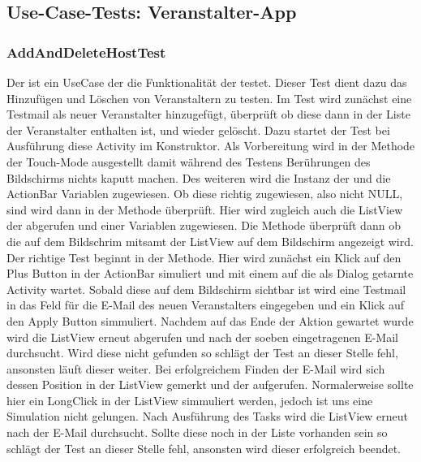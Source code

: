 \subsection{Use-Case-Tests: Veranstalter-App}
\subsubsection{AddAndDeleteHostTest}
Der  ist ein UseCase der die Funktionalität der  testet. Dieser Test dient dazu das Hinzufügen und Löschen von Veranstaltern zu testen. Im Test wird zunächst eine Testmail als neuer Veranstalter hinzugefügt, überprüft ob diese dann in der Liste der Veranstalter enthalten ist, und wieder gelöscht. Dazu startet der Test bei Ausführung diese Activity im Konstruktor. Als Vorbereitung wird in der  Methode der Touch-Mode ausgestellt damit während des Testens Berührungen des Bildschirms nichts kaputt machen. Des weiteren wird die Instanz der  und die ActionBar Variablen zugewiesen. Ob diese richtig zugewiesen, also nicht NULL, sind wird dann in der  Methode überprüft. Hier wird zugleich auch die ListView der  abgerufen und einer Variablen zugewiesen. Die  Methode überprüft dann ob die  auf dem Bildschrim mitsamt der ListView auf dem Bildschirm angezeigt wird. Der richtige Test beginnt in der  Methode. Hier wird zunächst ein Klick auf den Plus Button in der ActionBar simuliert und mit einem  auf die als Dialog getarnte  Activity wartet. Sobald diese auf dem Bildschirm sichtbar ist wird eine Testmail in das Feld für die E-Mail des neuen Veranstalters eingegeben und ein Klick auf den Apply Button simmuliert. Nachdem auf das Ende der Aktion gewartet wurde wird die ListView erneut abgerufen und nach der soeben eingetragenen E-Mail durchsucht. Wird diese nicht gefunden so schlägt der Test an dieser Stelle fehl, ansonsten läuft dieser weiter. Bei erfolgreichem Finden der E-Mail wird sich dessen Position in der ListView gemerkt und der  aufgerufen. Normalerweise sollte hier ein LongClick in der ListView simmuliert werden, jedoch ist uns eine Simulation nicht gelungen. Nach Ausführung des Tasks wird die ListView erneut nach der E-Mail durchsucht. Sollte diese noch in der Liste vorhanden sein so schlägt der Test an dieser Stelle fehl, ansonsten wird dieser erfolgreich beendet.

